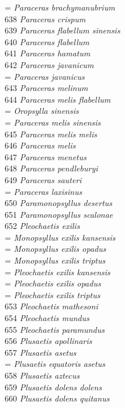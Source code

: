 \documentclass[
]{article}
\begin{document}
= \emph{Paraceras brachymanubrium}\\
638 \emph{Paraceras crispum}\\
639 \emph{Paraceras flabellum sinensis}\\
640 \emph{Paraceras flabellum}\\
641 \emph{Paraceras hamatum}\\
642 \emph{Paraceras javanicum}\\
= \emph{Paraceras javanicus}\\
643 \emph{Paraceras melinum}\\
644 \emph{Paraceras melis flabellum}\\
= \emph{Oropsylla sinensis}\\
= \emph{Paraceras melis sinensis}\\
645 \emph{Paraceras melis melis}\\
646 \emph{Paraceras melis}\\
647 \emph{Paraceras menetus}\\
648 \emph{Paraceras pendleburyi}\\
649 \emph{Paraceras sauteri}\\
= \emph{Paraceras laxisinus}\\
650 \emph{Paramonopsyllus desertus}\\
651 \emph{Paramonopsyllus scalonae}\\
652 \emph{Pleochaetis exilis}\\
= \emph{Monopsyllus exilis kansensis}\\
= \emph{Monopsyllus exilis opadus}\\
= \emph{Monopsyllus exilis triptus}\\
= \emph{Pleochaetis exilis kansensis}\\
= \emph{Pleochaetis exilis opadus}\\
= \emph{Pleochaetis exilis triptus}\\
653 \emph{Pleochaetis mathesoni}\\
654 \emph{Pleochaetis mundus}\\
655 \emph{Pleochaetis paramundus}\\
656 \emph{Plusaetis apollinaris}\\
657 \emph{Plusaetis asetus}\\
= \emph{Plusaetis equatoris asetus}\\
658 \emph{Plusaetis aztecus}\\
659 \emph{Plusaetis dolens dolens}\\
660 \emph{Plusaetis dolens quitanus}\\
\end{document}
